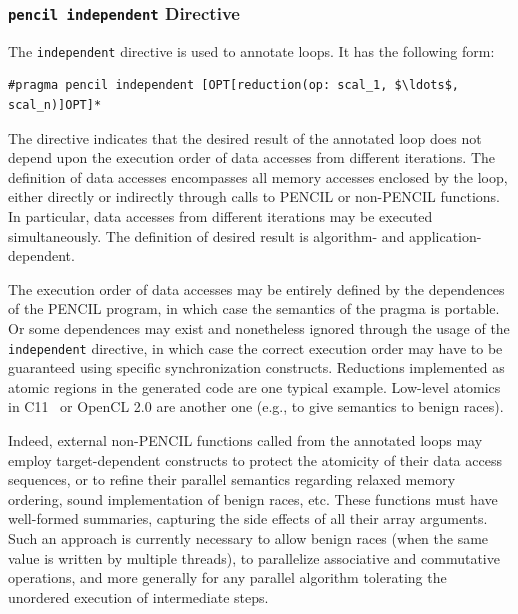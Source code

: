 \subsubsection{\lstinline!pencil independent! Directive\label{sec:independent}}


The \lstinline!independent! directive is used to annotate loops.
It has the following form:
\begin{lstlisting}[language=pencil]
#pragma pencil independent [OPT[reduction(op: scal_1, $\ldots$, scal_n)]OPT]*
\end{lstlisting}



The directive indicates that the desired result of the annotated
loop does not depend upon the execution order of data accesses
from different iterations.  The definition of data accesses
encompasses all memory accesses enclosed by the loop, either directly
or indirectly through calls to PENCIL or non-PENCIL functions. In
particular, data accesses from different iterations may be executed
simultaneously. The definition of desired result is algorithm- and
application-dependent.

The execution order of data accesses may be entirely defined by
the dependences of the PENCIL program, in which case the semantics of
the pragma is portable. Or some dependences may exist and nonetheless
ignored through the usage of the \lstinline!independent! directive,
in which case the correct execution order may have to be guaranteed
using specific synchronization constructs.
Reductions implemented as atomic regions in the generated code are one
typical example. Low-level atomics in C11~\cite{c11} or OpenCL 2.0 are another one
(e.g., to give semantics to benign races).

Indeed, external non-PENCIL functions called from the annotated loops
may employ target-dependent constructs to protect the atomicity of
their data access sequences, or to refine their parallel semantics
regarding relaxed memory ordering, sound implementation of benign
races, etc. These functions must have well-formed summaries, capturing
the side effects of all their array arguments.  Such an approach is
currently necessary to allow benign races (when the same value is
written by multiple threads), to parallelize associative and commutative
operations, and more generally for any parallel algorithm tolerating
the unordered execution of intermediate steps.

